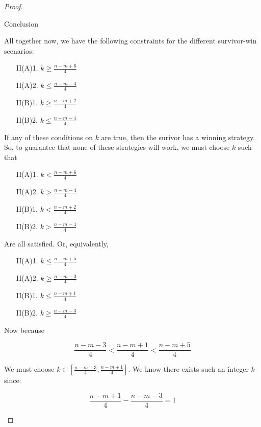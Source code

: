 \documentclass[letterpaper, 10pt]{article}
\begin{document}
\begin{proof}
\begin{proofpart} Conclusion


All together now, we have the following constraints for the different survivor-win scenarios:

\begin{itemize}
\item[II(A)1.] $k \geq \frac{n-m+6}{4}$
\item[II(A)2.] $k \leq \frac{n-m-4}{4}$
\item[II(B)1.] $k \geq \frac{n-m+2}{4}$
\item[II(B)2.] $k \leq \frac{n-m-4}{4}$

\end{itemize}

If any of these conditions on $k$ are true, then the surivor has a winning strategy.
So, to guarantee that none of these strategies will work, we must choose $k$ such that

\begin{itemize}
\item[II(A)1.] $k < \frac{n-m+6}{4}$
\item[II(A)2.] $k > \frac{n-m-4}{4}$
\item[II(B)1.] $k < \frac{n-m+2}{4}$
\item[II(B)2.] $k > \frac{n-m-4}{4}$
\end{itemize}

Are all satisfied. Or, equivalently,

\begin{itemize}
\item[II(A)1.] $k \leq \frac{n-m+5}{4}$
\item[II(A)2.] $k \geq \frac{n-m-3}{4}$
\item[II(B)1.] $k \leq \frac{n-m+1}{4}$
\item[II(B)2.] $k \geq \frac{n-m-3}{4}$
\end{itemize}

Now because

\[ \frac{n-m-3}{4} < \frac{n-m+1}{4} < \frac{n-m+5}{4} \]

We must choose $k \in [\frac{n-m-3}{4}, \frac{n-m+1}{4}]$. We know there exists
such an integer $k$ since:

\[ \frac{n-m+1}{4} - \frac{n-m-3}{4} = 1 \]

\end{proofpart}

\end{proof}
\end{document}
